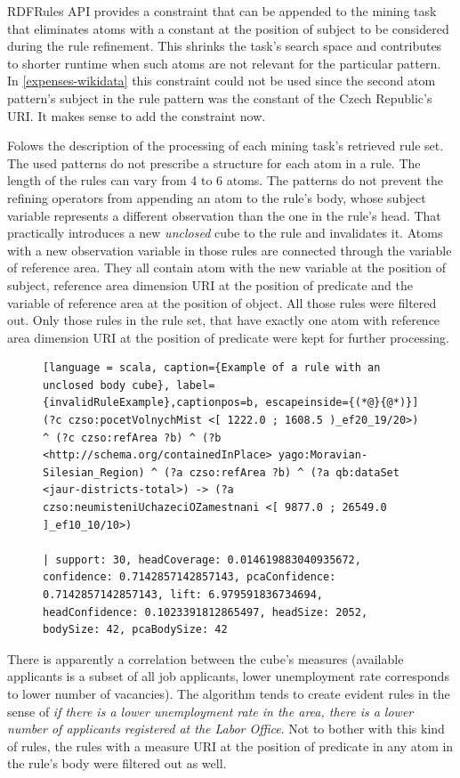 RDFRules API provides a constraint that can be appended to the mining task that eliminates atoms with a constant at the position of subject to be considered during the rule refinement. This shrinks the task's search space and contributes to shorter runtime when such atoms are not relevant for the particular pattern. In \ref{expenses-wikidata} this constraint could not be used since the second atom pattern's subject in the rule pattern was the constant of the Czech Republic's URI. It makes sense to add the constraint now.

Folows the description of the processing of each mining task's retrieved rule set. The used patterns do not prescribe a structure for each atom in a rule. The length of the rules can vary from 4 to 6 atoms. The patterns do not prevent the refining operators from appending an atom to the rule's body, whose subject variable represents a different observation than the one in the rule's head. That practically introduces a new \textit{unclosed} cube to the rule and invalidates it. Atoms with a new observation variable in those rules are connected through the variable of reference area. They all contain atom with the new variable at the position of subject, reference area dimension URI at the position of predicate and the variable of reference area at the position of object. All those rules were filtered out. Only those rules in the rule set, that have exactly one atom with reference area dimension URI at the position of predicate were kept for further processing.

\begin{figure}[h]
\begin{lstlisting}[language = scala, caption={Example of a rule with an unclosed body cube}, label={invalidRuleExample},captionpos=b, escapeinside={(*@}{@*)}]
(?c czso:pocetVolnychMist <[ 1222.0 ; 1608.5 )_ef20_19/20>) ^ (?c czso:refArea ?b) ^ (?b <http://schema.org/containedInPlace> yago:Moravian-Silesian_Region) ^ (?a czso:refArea ?b) ^ (?a qb:dataSet <jaur-districts-total>) -> (?a czso:neumisteniUchazeciOZamestnani <[ 9877.0 ; 26549.0 ]_ef10_10/10>) 

| support: 30, headCoverage: 0.014619883040935672, confidence: 0.7142857142857143, pcaConfidence: 0.7142857142857143, lift: 6.979591836734694, headConfidence: 0.1023391812865497, headSize: 2052, bodySize: 42, pcaBodySize: 42
\end{lstlisting}
\end{figure}

There is apparently a correlation between the cube's measures (available applicants is a subset of all job applicants, lower unemployment rate corresponds to lower number of vacancies). The algorithm tends to create evident rules in the sense of \textit{if there is a lower unemployment rate in the area, there is a lower number of applicants registered at the Labor Office}. Not to bother with this kind of rules, the rules with a measure URI at the position of predicate in any atom in the rule's body were filtered out as well. 

